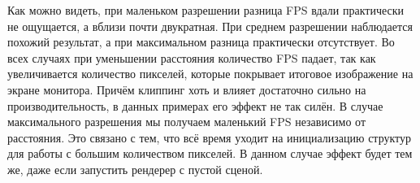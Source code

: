 \documentclass{article}
\begin{document}
Как можно видеть, при маленьком разрешении разница FPS вдали практически не ощущается, а вблизи почти двукратная.
При среднем разрешении наблюдается похожий результат, а при максимальном разница практически отсутствует.
Во всех случаях при уменьшении расстояния количество FPS падает, так как увеличивается количество пикселей, которые покрывает итоговое изображение на экране монитора.
Причём клиппинг хоть и влияет достаточно сильно на производительность, в данных примерах его эффект не так силён.
В случае максимального разрешения мы получаем маленький FPS независимо от расстояния.
Это связано с тем, что всё время уходит на инициализацию структур для работы с большим количеством пикселей.
В данном случае эффект будет тем же, даже если запустить рендерер с пустой сценой.

\newpage




\end{document}
